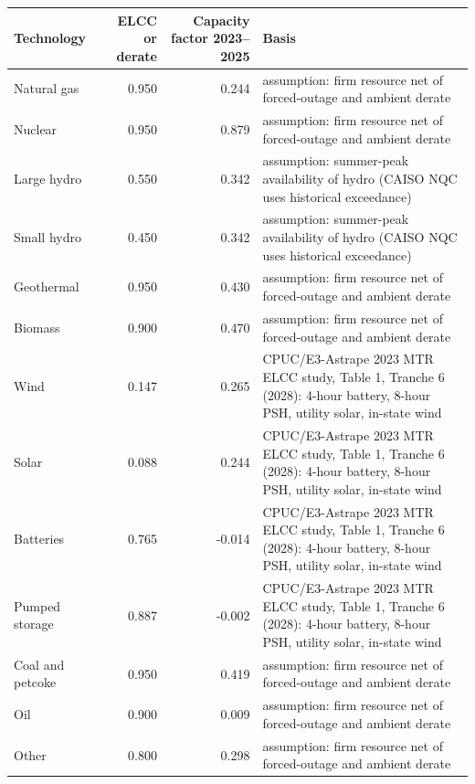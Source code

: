 \begin{tabular}{lrrp{9cm}}
\toprule
Technology & ELCC or derate & Capacity factor 2023--2025 & Basis \\
\midrule
Natural gas & 0.950 & 0.244 & assumption: firm resource net of forced-outage and ambient derate \\
Nuclear & 0.950 & 0.879 & assumption: firm resource net of forced-outage and ambient derate \\
Large hydro & 0.550 & 0.342 & assumption: summer-peak availability of hydro (CAISO NQC uses historical exceedance) \\
Small hydro & 0.450 & 0.342 & assumption: summer-peak availability of hydro (CAISO NQC uses historical exceedance) \\
Geothermal & 0.950 & 0.430 & assumption: firm resource net of forced-outage and ambient derate \\
Biomass & 0.900 & 0.470 & assumption: firm resource net of forced-outage and ambient derate \\
Wind & 0.147 & 0.265 & CPUC/E3-Astrape 2023 MTR ELCC study, Table 1, Tranche 6 (2028): 4-hour battery, 8-hour PSH, utility solar, in-state wind \\
Solar & 0.088 & 0.244 & CPUC/E3-Astrape 2023 MTR ELCC study, Table 1, Tranche 6 (2028): 4-hour battery, 8-hour PSH, utility solar, in-state wind \\
Batteries & 0.765 & -0.014 & CPUC/E3-Astrape 2023 MTR ELCC study, Table 1, Tranche 6 (2028): 4-hour battery, 8-hour PSH, utility solar, in-state wind \\
Pumped storage & 0.887 & -0.002 & CPUC/E3-Astrape 2023 MTR ELCC study, Table 1, Tranche 6 (2028): 4-hour battery, 8-hour PSH, utility solar, in-state wind \\
Coal and petcoke & 0.950 & 0.419 & assumption: firm resource net of forced-outage and ambient derate \\
Oil & 0.900 & 0.009 & assumption: firm resource net of forced-outage and ambient derate \\
Other & 0.800 & 0.298 & assumption: firm resource net of forced-outage and ambient derate \\
\bottomrule
\end{tabular}